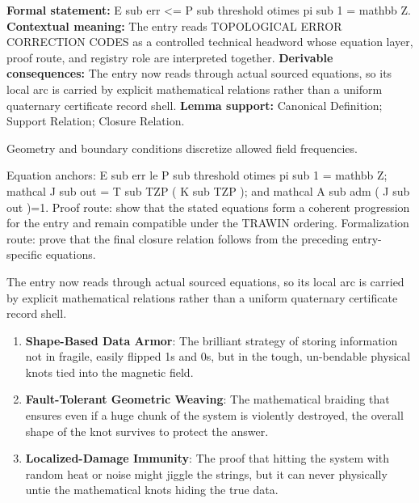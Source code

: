\begingroup\footnotesize\setlength{\emergencystretch}{3em}\sloppy
\textbf{Formal statement:} E sub err <= P sub threshold otimes pi sub 1 = mathbb Z. \textbf{Contextual meaning:} The entry reads TOPOLOGICAL ERROR CORRECTION CODES as a controlled technical headword whose equation layer, proof route, and registry role are interpreted together. \textbf{Derivable consequences:} The entry now reads through actual sourced equations, so its local arc is carried by explicit mathematical relations rather than a uniform quaternary certificate record shell. \textbf{Lemma support:} Canonical Definition; Support Relation; Closure Relation.\par
\endgroup

Geometry and boundary conditions discretize allowed field frequencies.

Equation anchors: E sub err le P sub threshold otimes pi sub 1 = mathbb Z; mathcal J sub out = T sub TZP ( K sub TZP ); and mathcal A sub adm ( J sub out )=1. Proof route: show that the stated equations form a coherent progression for the entry and remain compatible under the TRAWIN ordering. Formalization route: prove that the final closure relation follows from the preceding entry-specific equations.

The entry now reads through actual sourced equations, so its local arc is carried by explicit mathematical relations rather than a uniform quaternary certificate record shell.
\endgroup

\begin{enumerate}[leftmargin=1.6em,itemsep=6pt,topsep=4pt]
\item \textbf{Shape-Based Data Armor}: The brilliant strategy of storing information not in fragile, easily flipped 1s and 0s, but in the tough, un-bendable physical knots tied into the magnetic field.
\item \textbf{Fault-Tolerant Geometric Weaving}: The mathematical braiding that ensures even if a huge chunk of the system is violently destroyed, the overall shape of the knot survives to protect the answer.
\item \textbf{Localized-Damage Immunity}: The proof that hitting the system with random heat or noise might jiggle the strings, but it can never physically untie the mathematical knots hiding the true data.
\end{enumerate}

